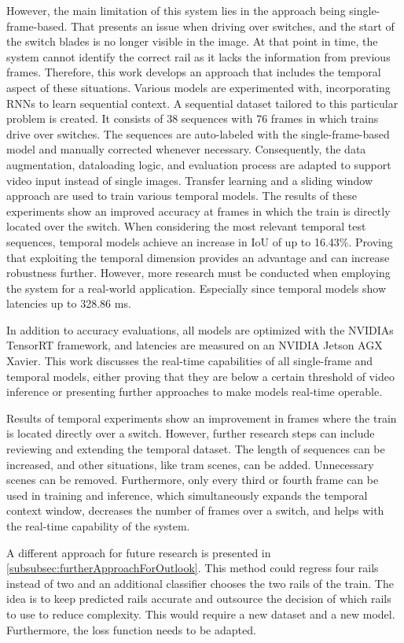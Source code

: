 However, the main limitation of this system lies in the approach being single-frame-based.
That presents an issue when driving over switches, and the start of the switch blades is no longer visible in the image.
At that point in time, the system cannot identify the correct rail as it lacks the information from previous frames.
Therefore, this work develops an approach that includes the temporal aspect of these situations.
Various models are experimented with, incorporating \ac{RNN}s to learn sequential context.
A sequential dataset tailored to this particular problem is created.
It consists of 38 sequences with 76 frames in which trains drive over switches.
The sequences are auto-labeled with the single-frame-based model and manually corrected whenever necessary.
Consequently, the data augmentation, dataloading logic, and evaluation process are adapted to support video input instead of single images.
Transfer learning and a sliding window approach are used to train various temporal models.
The results of these experiments show an improved accuracy at frames in which the train is directly located over the switch.
When considering the most relevant temporal test sequences, temporal models achieve an increase in \ac{IoU} of up to 16.43\%.
Proving that exploiting the temporal dimension provides an advantage and can increase robustness further.
However, more research must be conducted when employing the system for a real-world application.
Especially since temporal models show latencies up to 328.86 ms.

In addition to accuracy evaluations, all models are optimized with the NVIDIAs TensorRT framework, and latencies are measured on an NVIDIA Jetson AGX Xavier.
This work discusses the real-time capabilities of all single-frame and temporal models, either proving that they are below a certain threshold of video inference or presenting further approaches to make models real-time operable.

\vspace{2cm}

\noindent Results of temporal experiments show an improvement in frames where the train is located directly over a switch.
However, further research steps can include reviewing and extending the temporal dataset.
The length of sequences can be increased, and other situations, like tram scenes, can be added.
Unnecessary scenes can be removed.
Furthermore, only every third or fourth frame can be used in training and inference, which simultaneously expands the temporal context window, decreases the number of frames over a switch, and helps with the real-time capability of the system.

A different approach for future research is presented in \autoref{subsubsec:furtherApproachForOutlook}.
This method could regress four rails instead of two and an additional classifier chooses the two rails of the train.
The idea is to keep predicted rails accurate and outsource the decision of which rails to use to reduce complexity.
This would require a new dataset and a new model.
Furthermore, the loss function needs to be adapted.
